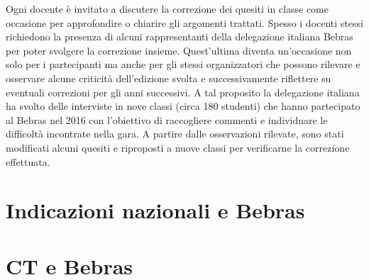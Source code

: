 \documentclass[12pt]{report}
\begin{document}
Ogni docente è invitato a discutere la correzione dei quesiti in classe  come occasione per approfondire o chiarire gli argomenti trattati. Spesso i docenti stessi richiedono la presenza di alcuni rappresentanti della delegazione italiana Bebras per poter svolgere la correzione insieme. Quest'ultima diventa un'occasione non solo per i partecipanti ma anche per gli stessi organizzatori che possono rilevare e osservare alcune criticità dell'edizione svolta e successivamente riflettere su eventuali correzioni per gli anni successivi.
A tal proposito la delegazione italiana ha svolto delle interviste \cite{LonatiKoli2017} in nove classi (circa 180 studenti) che hanno partecipato al Bebras nel 2016 con l'obiettivo di raccogliere commenti e individuare le difficoltà incontrate nella gara. 
A partire dalle osservazioni rilevate, sono stati modificati alcuni quesiti e riproposti a nuove classi per verificarne la correzione effettuata.



\chapter{Indicazioni nazionali e Bebras}
\label{cap2}

%
%
\chapter{CT e Bebras}



\label{cap3}
%
%
\end{document}
